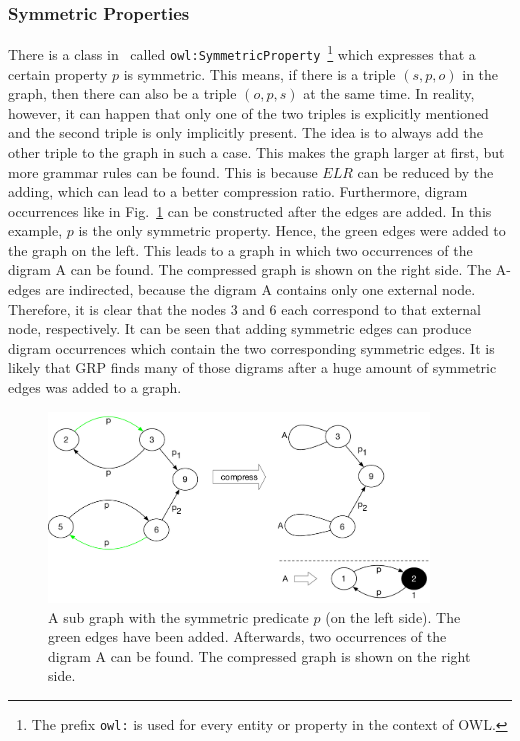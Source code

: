 \clearpage
\subsubsection{Symmetric Properties}

There is a class in~\cite{owl} called {\tt owl:SymmetricProperty}~\footnote{The prefix {\tt owl:} is used for every entity or property in the context of OWL.} which expresses that a certain property $p$ is symmetric. This means, if there is a triple $(s,p,o)$ in the graph, then there can also be a triple $(o,p,s)$ at the same time. In reality, however, it can happen that only one of the two triples is explicitly mentioned and the second triple is only implicitly present. The idea is to always add the other triple to the graph in such a case. This makes the graph larger at first, but more grammar rules can be found. This is because $ELR$ can be reduced by the adding, which can lead to a better compression ratio. Furthermore, digram occurrences like in Fig.~\ref{fig:symDirectReplacement} can be constructed after the edges are added. In this example, $p$ is the only symmetric property. Hence, the green edges were added to the graph on the left. This leads to a graph in which two occurrences of the digram A can be found. The compressed graph is shown on the right side. The A-edges are indirected, because the digram A contains only one external node. Therefore, it is clear that the nodes 3 and 6 each correspond to that external node, respectively. It can be seen that adding symmetric edges can produce digram occurrences which contain the two corresponding symmetric edges. It is likely that GRP finds many of those digrams after a huge amount of symmetric edges was added to a graph.

\begin{figure}[h]
	\centering
	\includegraphics[width=0.9\textwidth]{figures/approach/symmetricMatEx2}
	\caption{A sub graph with the symmetric predicate $p$ (on the left side). The green edges have been added. Afterwards, two occurrences of the digram A can be found. The compressed graph is shown on the right side.}
	\label{fig:symDirectReplacement}
\end{figure}


